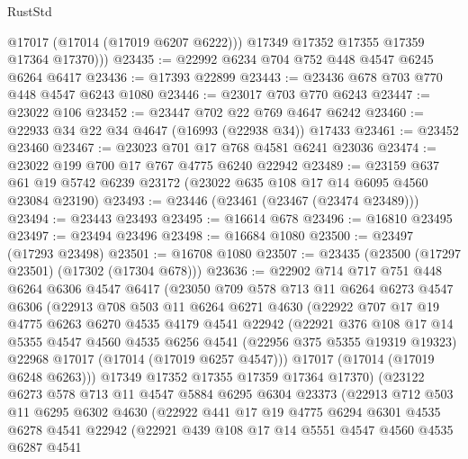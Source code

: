\begin{lexlean}{RustStd}
\begin{coremodule}
{\begin{coremodule}
{{{{{{{{{{{{{{{{{{{{{{{{{{{{{{{{{{{{{{{{{{{{{{{{{{{{{{{            @17017
            (@17014 (@17019 @6207 @6222)))
          @17349
          @17352
          @17355
          @17359
          @17364
          @17370)))
@23435 := @22992 @6234 @704 @752 @448 @4547 @6245 @6264 @6417
@23436 := @17393 @22899
@23443 := @23436 @678 @703 @770 @448 @4547 @6243 @1080
@23446 := @23017 @703 @770 @6243
@23447 := @23022 @106
@23452 := @23447 @702 @22 @769 @4647 @6242
@23460 := @22933 @34 @22 @34 @4647 (@16993 (@22938 @34)) @17433
@23461 := @23452 @23460
@23467 := @23023 @701 @17 @768 @4581 @6241 @23036
@23474 := @23022 @199 @700 @17 @767 @4775 @6240 @22942
@23489 := @23159
    @637
    @61
    @19
    @5742
    @6239
    @23172
    (@23022 @635 @108 @17 @14 @6095 @4560 @23084 @23190)
@23493 := @23446 (@23461 (@23467 (@23474 @23489)))
@23494 := @23443 @23493
@23495 := @16614 @678
@23496 := @16810 @23495
@23497 := @23494 @23496
@23498 := @16684 @1080
@23500 := @23497 (@17293 @23498)
@23501 := @16708 @1080
@23507 := @23435 (@23500 (@17297 @23501) (@17302 (@17304 @678)))
@23636 := @22902
    @714
    @717
    @751
    @448
    @6264
    @6306
    @4547
    @6417
    (@23050
      @709
      @578
      @713
      @11
      @6264
      @6273
      @4547
      @6306
      (@22913
        @708
        @503
        @11
        @6264
        @6271
        @4630
        (@22922
          @707
          @17
          @19
          @4775
          @6263
          @6270
          @4535
          @4179
          @4541
          @22942
          (@22921
            @376
            @108
            @17
            @14
            @5355
            @4547
            @4560
            @4535
            @6256
            @4541
            (@22956 @375 @5355 @19319 @19323)
            @22968
            @17017
            (@17014 (@17019 @6257 @4547)))
          @17017
          (@17014 (@17019 @6248 @6263)))
        @17349
        @17352
        @17355
        @17359
        @17364
        @17370)
      (@23122
        @6273
        @578
        @713
        @11
        @4547
        @5884
        @6295
        @6304
        @23373
        (@22913
          @712
          @503
          @11
          @6295
          @6302
          @4630
          (@22922
            @441
            @17
            @19
            @4775
            @6294
            @6301
            @4535
            @6278
            @4541
            @22942
            (@22921
              @439
              @108
              @17
              @14
              @5551
              @4547
              @4560
              @4535
              @6287
              @4541
}}}}}}}}}}}}}}}}}}}}}}}}}}}}}}}}}}}}}}}}}}}}}}}}}}}}}}}
\end{coremodule}}
\end{coremodule}
\end{lexlean}

